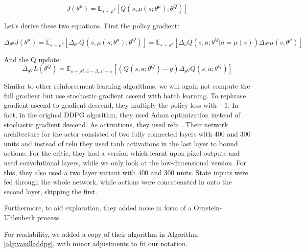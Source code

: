 \documentclass[hyperref,german,beleg]{cgvpub}
\begin{document}
\begin{equation}
J(\theta^{\mu}) = \mathbb{E}_{s \sim \rho^{\beta}}[Q(s, \mu(s;\theta^{\mu});\theta^Q)]
\end{equation}

Let's derive these two equations. First the policy gradient:

\begin{equation}
\Delta_{\theta^{\mu}}J(\theta^{\mu}) = \mathbb{E}_{s \sim \rho^{\beta}}[\Delta_{\theta^{\mu}}Q(s, \mu(s;\theta^{\mu});\theta^Q)] = \mathbb{E}_{s \sim \rho^{\beta}}[\Delta_a Q(s, a;\theta^Q | a=\mu(s)) \Delta_{\theta^{\mu}}\mu(s;\theta^{\mu})]
\end{equation}

And the Q update:
\begin{equation}
\Delta_{\theta^Q} L(\theta^Q) = \mathbb{E}_{s \sim \rho^{\beta}, a \sim \beta, s' \sim \varepsilon}[(Q(s, a;\theta^Q) - y)\Delta_{\theta^Q}Q(s, a;\theta^Q)]
\end{equation}

Similar to other reinforcement learning algorithms, we will again not compute the full gradient but use stochastic gradient ascend with batch learning. To rephrase gradient ascend to gradient descend, they multiply the policy loss with $-1$. In fact, in the original \ac{DDPG} algorithm, they used Adam \cite{kingmaAdamMethodStochastic2017} optimization instead of stochastic gradient descend. As activations, they used relu \cite{agarapDeepLearningUsing2019}. Their network architecture for the actor consisted of two fully connected layers with 400 and 300 units and instead of relu they used tanh activations in the last layer to bound actions. For the critic, they had a version which learnt upon pixel outputs and used convolutional layers, while we only look at the low-dimensional version. For this, they also used a two layer variant with 400 and 300 units. State inputs were fed through the whole network, while actions were concatenated in onto the second layer, skipping the first.

Furthermore, to aid exploration, they added noise in form of a Ornstein-Uhlenbeck process \cite{uhlenbeckTheoryBrownianMotion1930}.

For readability, we added a copy of their algorithm in Algorithm \ref{alg:vanilladdpg}, with minor adjustments to fit our notation.
\end{document}
